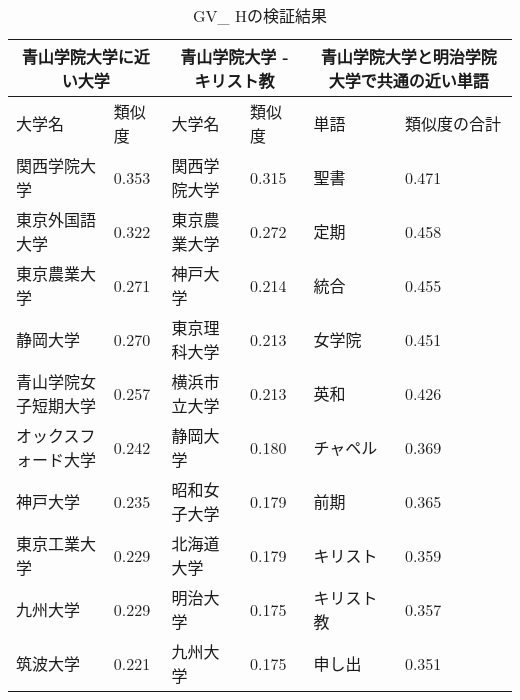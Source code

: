 \begin{table}[H]
\caption{GV\_ Hの検証結果}
\centering
\footnotesize
\begin{tabular}{ll|ll|ll}
\hline
\multicolumn{2}{c}{青山学院大学に近い大学} & \multicolumn{2}{c}{青山学院大学 - キリスト教} & \multicolumn{2}{c}{青山学院大学と明治学院大学で共通の近い単語}
\\ \hline
大学名 & 類似度 & 大学名 & 類似度 & 単語 & 類似度の合計
\\ \hline \hline
関西学院大学 & 0.353 & 関西学院大学 & 0.315 & 聖書 & 0.471\\
東京外国語大学 & 0.322 & 東京農業大学 & 0.272 & 定期 & 0.458\\
東京農業大学 & 0.271 & 神戸大学 & 0.214 & 統合 & 0.455\\
静岡大学 & 0.270 & 東京理科大学 & 0.213 & 女学院 & 0.451\\
青山学院女子短期大学 & 0.257 & 横浜市立大学 & 0.213 & 英和 & 0.426\\
オックスフォード大学 & 0.242 & 静岡大学 & 0.180 & チャペル & 0.369\\
神戸大学 & 0.235 & 昭和女子大学 & 0.179 & 前期 & 0.365\\
東京工業大学 & 0.229 & 北海道大学 & 0.179 & キリスト & 0.359\\
九州大学 & 0.229 & 明治大学 & 0.175 & キリスト教 & 0.357\\
筑波大学 & 0.221 & 九州大学 & 0.175 & 申し出 & 0.351\\ \hline
\end{tabular}
\label{table:gvh}
\end{table}

